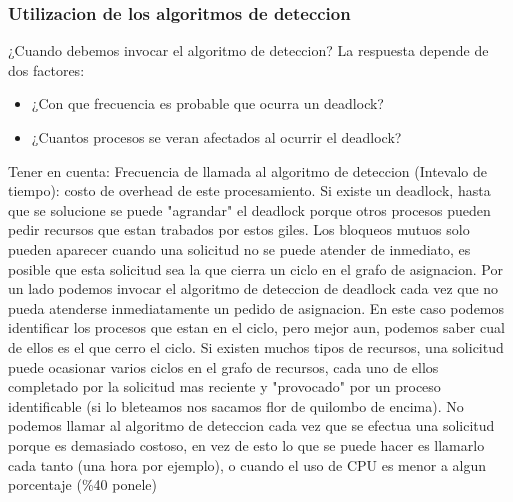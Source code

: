\documentclass[a4paper,10pt]{article}
\begin{document}
\subsubsection{Utilizacion de los algoritmos de deteccion}
¿Cuando debemos invocar el algoritmo de deteccion? La respuesta depende de dos factores:
\begin{itemize}
 \item ¿Con que frecuencia es probable que ocurra un deadlock?
 \item ¿Cuantos procesos se veran afectados al ocurrir el deadlock?
\end{itemize}
Tener en cuenta:
Frecuencia de llamada al algoritmo de deteccion (Intevalo de tiempo): costo de overhead de este procesamiento.
Si existe un deadlock, hasta que se solucione se puede "agrandar" el deadlock porque otros procesos pueden pedir recursos que estan trabados por estos giles.
Los bloqueos mutuos solo pueden aparecer cuando una solicitud no se puede atender de inmediato, es posible que esta solicitud sea la que cierra un ciclo en el grafo de asignacion. Por un lado podemos invocar el algoritmo de deteccion de deadlock cada vez que no pueda atenderse inmediatamente un pedido de asignacion. En este caso podemos identificar los procesos que estan en el ciclo, pero mejor aun, podemos saber cual de ellos es el que cerro el ciclo. Si existen muchos tipos de recursos, una solicitud puede ocasionar varios ciclos en el grafo de recursos, cada uno de ellos completado por la solicitud mas reciente y "provocado" por un proceso identificable (si lo bleteamos nos sacamos flor de quilombo de encima).
No podemos llamar al algoritmo de deteccion cada vez que se efectua una solicitud porque es demasiado costoso, en vez de esto lo que se puede hacer es llamarlo cada tanto (una hora por ejemplo), o cuando el uso de CPU es menor a algun porcentaje (\%40 ponele)



\end{document}
